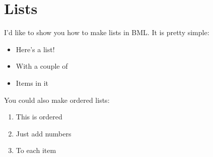 \documentclass[a4paper]{article}
\begin{document}
\section{Lists}

I'd like to show you how to make lists in BML. It is pretty
simple:
\bigbreak
\begin{itemize}
\item Here's a list!

\item With a couple of

\item Items in it

\end{itemize}
\bigbreak
You could also make ordered lists:
\bigbreak
\begin{enumerate}
\item This is ordered

\item Just add numbers

\item To each item

\end{enumerate}
\bigbreak
\end{document}
